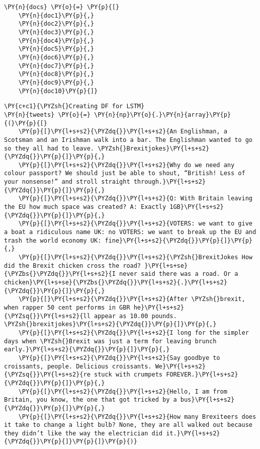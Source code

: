 \begin{tcolorbox}[breakable, size=fbox, boxrule=1pt, pad at break*=1mm,colback=cellbackground, colframe=cellborder]
\begin{Verbatim}[commandchars=\\\{\}]
\PY{n}{docs} \PY{o}{=} \PY{p}{[}
    \PY{n}{doc1}\PY{p}{,}
    \PY{n}{doc2}\PY{p}{,}
    \PY{n}{doc3}\PY{p}{,}
    \PY{n}{doc4}\PY{p}{,}
    \PY{n}{doc5}\PY{p}{,}
    \PY{n}{doc6}\PY{p}{,}
    \PY{n}{doc7}\PY{p}{,}
    \PY{n}{doc8}\PY{p}{,}
    \PY{n}{doc9}\PY{p}{,}
    \PY{n}{doc10}\PY{p}{]}
\end{Verbatim}
\end{tcolorbox}

    \begin{tcolorbox}[breakable, size=fbox, boxrule=1pt, pad at break*=1mm,colback=cellbackground, colframe=cellborder]
\begin{Verbatim}[commandchars=\\\{\}]
\PY{c+c1}{\PYZsh{}Creating DF for LSTM}
\PY{n}{tweets} \PY{o}{=} \PY{n}{np}\PY{o}{.}\PY{n}{array}\PY{p}{(}\PY{p}{[}
    \PY{p}{[}\PY{l+s+s2}{\PYZdq{}}\PY{l+s+s2}{An Englishman, a Scotsman and an Irishman walk into a bar. The Englishman wanted to go so they all had to leave. \PYZsh{}Brexitjokes}\PY{l+s+s2}{\PYZdq{}}\PY{p}{]}\PY{p}{,}
    \PY{p}{[}\PY{l+s+s2}{\PYZdq{}}\PY{l+s+s2}{Why do we need any colour passport? We should just be able to shout, “British! Less of your nonsense!” and stroll straight through.}\PY{l+s+s2}{\PYZdq{}}\PY{p}{]}\PY{p}{,}
    \PY{p}{[}\PY{l+s+s2}{\PYZdq{}}\PY{l+s+s2}{Q: With Britain leaving the EU how much space was created? A: Exactly 1GB}\PY{l+s+s2}{\PYZdq{}}\PY{p}{]}\PY{p}{,}
    \PY{p}{[}\PY{l+s+s2}{\PYZdq{}}\PY{l+s+s2}{VOTERS: we want to give a boat a ridiculous name UK: no VOTERS: we want to break up the EU and trash the world economy UK: fine}\PY{l+s+s2}{\PYZdq{}}\PY{p}{]}\PY{p}{,}
    \PY{p}{[}\PY{l+s+s2}{\PYZdq{}}\PY{l+s+s2}{\PYZsh{}BrexitJokes How did the Brexit chicken cross the road? }\PY{l+s+se}{\PYZbs{}\PYZdq{}}\PY{l+s+s2}{I never said there was a road. Or a chicken}\PY{l+s+se}{\PYZbs{}\PYZdq{}}\PY{l+s+s2}{.}\PY{l+s+s2}{\PYZdq{}}\PY{p}{]}\PY{p}{,}
    \PY{p}{[}\PY{l+s+s2}{\PYZdq{}}\PY{l+s+s2}{After \PYZsh{}brexit, when rapper 50 cent performs in GBR he}\PY{l+s+s2}{\PYZsq{}}\PY{l+s+s2}{ll appear as 10.00 pounds. \PYZsh{}brexitjokes}\PY{l+s+s2}{\PYZdq{}}\PY{p}{]}\PY{p}{,}
    \PY{p}{[}\PY{l+s+s2}{\PYZdq{}}\PY{l+s+s2}{I long for the simpler days when \PYZsh{}Brexit was just a term for leaving brunch early.}\PY{l+s+s2}{\PYZdq{}}\PY{p}{]}\PY{p}{,}
    \PY{p}{[}\PY{l+s+s2}{\PYZdq{}}\PY{l+s+s2}{Say goodbye to croissants, people. Delicious croissants. We}\PY{l+s+s2}{\PYZsq{}}\PY{l+s+s2}{re stuck with crumpets FOREVER.}\PY{l+s+s2}{\PYZdq{}}\PY{p}{]}\PY{p}{,}
    \PY{p}{[}\PY{l+s+s2}{\PYZdq{}}\PY{l+s+s2}{Hello, I am from Britain, you know, the one that got tricked by a bus}\PY{l+s+s2}{\PYZdq{}}\PY{p}{]}\PY{p}{,}
    \PY{p}{[}\PY{l+s+s2}{\PYZdq{}}\PY{l+s+s2}{How many Brexiteers does it take to change a light bulb? None, they are all walked out because they didn’t like the way the electrician did it.}\PY{l+s+s2}{\PYZdq{}}\PY{p}{]}\PY{p}{]}\PY{p}{)}


\end{Verbatim}
\end{tcolorbox}
